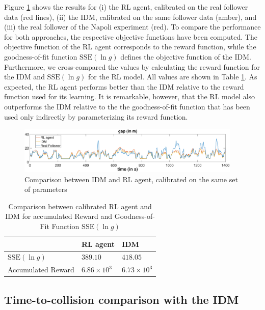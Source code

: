 \documentclass[review]{elsarticle}
\providecommand{\3}{{\ss}}
\begin{document}
	Figure \ref{fig:IDMvsRL} shows the results for (i) the RL
	agent, calibrated on the real follower data (red lines), (ii) the IDM,
	calibrated on the same follower data (amber), and (iii) the real
	follower of the Napoli experiment (red). To compare the
	performance for both approaches, the respective objective functions
	have been computed. The objective function of the RL agent corresponds
	to the reward function, while the goodness-of-fit function
	$\mathrm{SSE}(\ln g)$ defines the objective function of the
	IDM. Furthermore, we cross-compared the values by calculating the
	reward function for the IDM and $\mathrm{SSE}(\ln g)$ for the RL model. All
	values are shown in Table \ref{tab:objectiveFunc}. 
	As expected, the RL agent performs better than the IDM relative to the
	reward function used for its learning. It is remarkable, however, 
	that the RL model also outperforms the IDM relative to the
	the goodness-of-fit function that has been used only indirectly by
	parameterizing its reward function.
	
	\begin{figure}
		
		\centering
		\includegraphics[width=0.95\textwidth]{images/IDMvsRL_dist}
		\caption{Comparison between IDM and RL agent, calibrated on the same set of parameters}
		\label{fig:IDMvsRL}
	\end{figure}
	
	\begin{table}
		\caption{Comparison between calibrated RL agent and IDM for
			accumulated Reward and Goodness-of-Fit Function $\mathrm{SSE}(\ln g)$} 
		\label{tab:objectiveFunc} 
		\begin{center}
			\begin{tabular}{p{} | p{0.2\textwidth} p{}  } 
				& RL agent & IDM   \\ \hline
				$\mathrm{SSE}(\ln g)$ & $389.10$ &  $418.05$	\\
				Accumulated Reward &  $6.86 \times 10^3$   & $6.73\times 10^3$			
			\end{tabular}
		\end{center}
	\end{table}
	
	\subsection{Time-to-collision comparison with the IDM}
	
\end{document}
